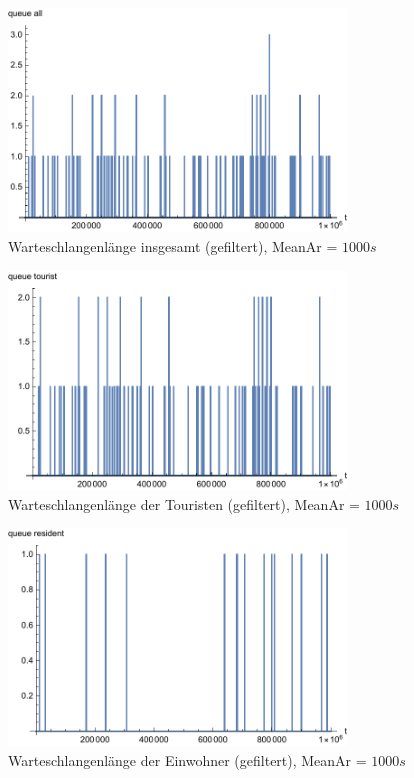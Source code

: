 \begin{figure}[htpb]
	\centering
	\includegraphics[width=0.8\textwidth]{abbildungen/1_Phone_VIP/Arrival_1000_Serve_100_dur_1000000_Skip_0/QueueStepPlotAllFiltered.pdf}
	\caption{Warteschlangenlänge insgesamt (gefiltert), MeanAr = $1000s$}
	\label{fig:QSPALL1000}
\end{figure}

\begin{figure}[htpb]
	\centering
	\includegraphics[width=0.8\textwidth]{abbildungen/1_Phone_VIP/Arrival_1000_Serve_100_dur_1000000_Skip_0/QueueStepPlotTouristFiltered.pdf}
	\caption{Warteschlangenlänge der Touristen (gefiltert), MeanAr = $1000s$}
	\label{fig:QSPTOURI1000}
\end{figure}

\begin{figure}[htpb]
	\centering
	\includegraphics[width=0.8\textwidth]{abbildungen/1_Phone_VIP/Arrival_1000_Serve_100_dur_1000000_Skip_0/QueueStepPlotResidentFiltered.pdf}
	\caption{Warteschlangenlänge der Einwohner (gefiltert), MeanAr = $1000s$}
	\label{fig:QSPVIP1000}
\end{figure}


